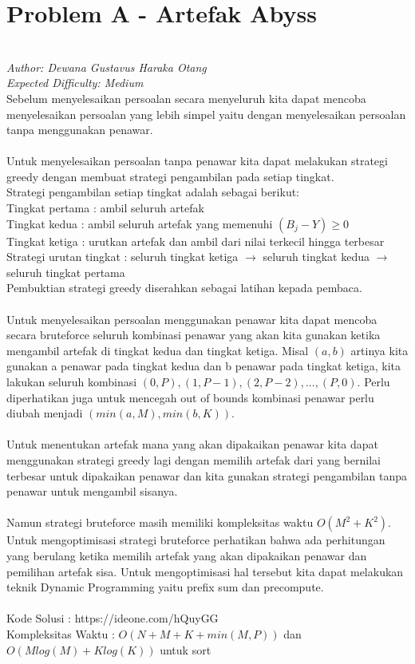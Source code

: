 \section*{Problem A - Artefak Abyss}
\\
\textit{Author: Dewana Gustavus Haraka Otang}
\\
\textit{Expected Difficulty: Medium}
\\

Sebelum menyelesaikan persoalan secara menyeluruh kita dapat mencoba menyelesaikan persoalan yang lebih simpel yaitu dengan menyelesaikan persoalan tanpa menggunakan penawar.\\
\\
Untuk menyelesaikan persoalan tanpa penawar kita dapat melakukan strategi greedy dengan membuat strategi pengambilan pada setiap tingkat.\\
Strategi pengambilan setiap tingkat adalah sebagai berikut:\\
Tingkat pertama : ambil seluruh artefak\\
Tingkat kedua : ambil seluruh artefak yang memenuhi $(B_j - Y) \geq 0$\\
Tingkat ketiga : urutkan artefak dan ambil dari nilai terkecil hingga terbesar\\
Strategi urutan tingkat : seluruh tingkat ketiga $\rightarrow$ seluruh tingkat kedua $\rightarrow$ seluruh tingkat pertama\\
Pembuktian strategi greedy diserahkan sebagai latihan kepada pembaca.\\
\\
Untuk menyelesaikan persoalan menggunakan penawar kita dapat mencoba secara bruteforce seluruh kombinasi penawar yang akan kita gunakan ketika mengambil artefak di tingkat kedua dan tingkat ketiga. Misal $(a,b)$ artinya kita gunakan a penawar pada tingkat kedua dan b penawar pada tingkat ketiga, kita lakukan seluruh kombinasi $(0, P), (1, P-1), (2, P-2), ..., (P, 0).$ Perlu diperhatikan juga untuk mencegah out of bounds kombinasi penawar perlu diubah menjadi $(min(a, M), min(b, K))$.\\
\\
Untuk menentukan artefak mana yang akan dipakaikan penawar kita dapat menggunakan strategi greedy lagi dengan memilih artefak dari yang bernilai terbesar untuk dipakaikan penawar dan kita gunakan strategi pengambilan tanpa penawar untuk mengambil sisanya.\\
\\
Namun strategi bruteforce masih memiliki kompleksitas waktu $O(M^2 + K^2)$. Untuk mengoptimisasi strategi bruteforce perhatikan bahwa ada perhitungan yang berulang ketika memilih artefak yang akan dipakaikan penawar dan pemilihan artefak sisa. Untuk mengoptimisasi hal tersebut kita dapat melakukan teknik Dynamic Programming yaitu prefix sum dan precompute.\\
\\
Kode Solusi : https://ideone.com/hQuyGG\\
Kompleksitas Waktu : $O(N + M + K + min(M, P))$ dan $O(M log(M) + K log(K))$ untuk sort